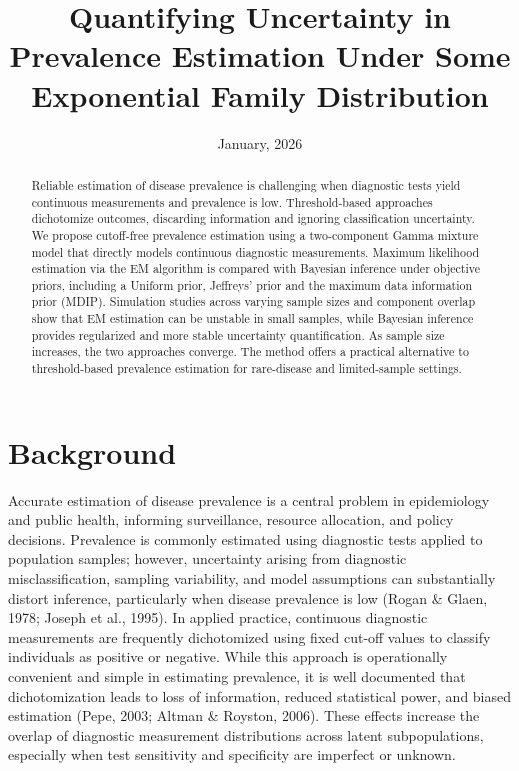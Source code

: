 \documentclass[11pt]{article}
\title{\bf Quantifying Uncertainty in Prevalence Estimation Under Some Exponential Family Distribution \vspace{.1in}}
\date{January, 2026}
\begin{document}
\sloppy
	\maketitle

\begin{abstract}
	\noindent
Reliable estimation of disease prevalence is challenging when diagnostic tests yield continuous measurements and prevalence is low. Threshold-based approaches dichotomize outcomes, discarding information and ignoring classification uncertainty. We propose cutoff-free prevalence estimation using a two-component Gamma mixture model that directly models continuous diagnostic measurements. Maximum likelihood estimation via the EM algorithm is compared with Bayesian inference under objective priors, including a Uniform prior, Jeffreys’ prior and the maximum data information prior (MDIP). Simulation studies across varying sample sizes and component overlap show that EM estimation can be unstable in small samples, while Bayesian inference provides regularized and more stable uncertainty quantification. As sample size increases, the two approaches converge. The method offers a practical alternative to threshold-based prevalence estimation for rare-disease and limited-sample settings.
\end{abstract}





\section{Background}

Accurate estimation of disease prevalence is a central problem in epidemiology and public health, informing surveillance, resource allocation, and policy decisions. Prevalence is commonly estimated using diagnostic tests applied to population samples; however, uncertainty arising from diagnostic misclassification, sampling variability, and model assumptions can substantially distort inference, particularly when disease prevalence is low (Rogan \& Glaen, 1978; Joseph et al., 1995).
In applied practice, continuous diagnostic measurements are frequently dichotomized using fixed cut-off values to classify individuals as positive or negative. While this approach is operationally convenient and simple in estimating prevalence, it is well documented that dichotomization leads to loss of information, reduced statistical power, and biased estimation (Pepe, 2003; Altman \& Royston, 2006). These effects increase the overlap of diagnostic measurement distributions across latent subpopulations, especially when test sensitivity and specificity are imperfect or unknown.
\end{document}
